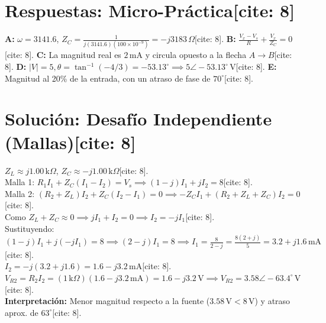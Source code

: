 \documentclass[11pt, a4paper]{article}
\begin{document}
\section*{Respuestas: Micro-Práctica[cite: 8]}
\textbf{A:} $\omega = 3141.6$, $Z_C = \frac{1}{j(3141.6)(100\times10^{-9})} = \boxed{-j3183\,\Omega}$[cite: 8]. \textbf{B:} $\boxed{\frac{V_x - V_s}{R} + \frac{V_x}{Z_C} = 0}$[cite: 8]. \textbf{C:} La magnitud real es $2\,\text{mA}$ y circula opuesto a la flecha $A \to B$[cite: 8]. \textbf{D:} $|V| = 5, \theta = \tan^{-1}(-4/3) = -53.13^\circ \implies \boxed{5\angle-53.13^\circ\,\text{V}}$[cite: 8]. \textbf{E:} Magnitud al 20\% de la entrada, con un atraso de fase de $70^\circ$[cite: 8].

\section*{Solución: Desafío Independiente (Mallas)[cite: 8]}
$Z_L \approx j1.00\,\text{k}\Omega$, $Z_C \approx -j1.00\,\text{k}\Omega$[cite: 8]. \\
Malla 1: $R_1 I_1 + Z_C(I_1 - I_2) = V_s \implies (1 - j)I_1 + jI_2 = 8$[cite: 8]. \\
Malla 2: $(R_2 + Z_L)I_2 + Z_C(I_2 - I_1) = 0 \implies -Z_C I_1 + (R_2 + Z_L + Z_C)I_2 = 0$[cite: 8]. \\
Como $Z_L + Z_C \approx 0 \implies jI_1 + I_2 = 0 \implies I_2 = -jI_1$[cite: 8]. \\
Sustituyendo: $(1 - j)I_1 + j(-jI_1) = 8 \implies (2 - j)I_1 = 8 \implies I_1 = \frac{8}{2-j} = \frac{8(2+j)}{5} = 3.2 + j1.6\,\text{mA}$[cite: 8]. \\
$I_2 = -j(3.2 + j1.6) = \boxed{1.6 - j3.2\,\text{mA}}$[cite: 8]. \\
$V_{R2} = R_2 I_2 = (1\,\text{k}\Omega)(1.6 - j3.2\,\text{mA}) = 1.6 - j3.2\,\text{V} \implies \boxed{V_{R2} = 3.58\angle-63.4^\circ\,\text{V}}$[cite: 8]. \\
\textbf{Interpretación:} Menor magnitud respecto a la fuente ($3.58\,\text{V} < 8\,\text{V}$) y atraso aprox. de $63^\circ$[cite: 8].
\end{document}
